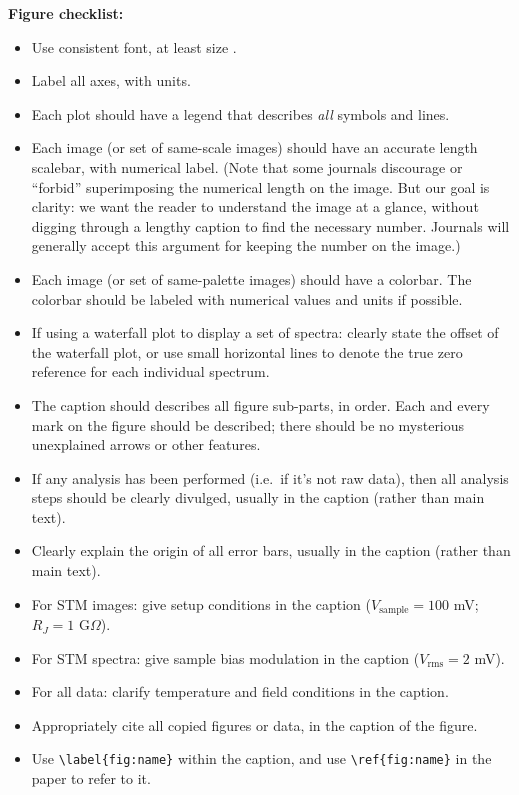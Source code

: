 \vspace{2mm}
\noindent \textbf{Figure checklist:}
\begin{itemize}[label=$\Box$]
\item Use consistent font, at least size \minfont.
\item Label all axes, with units.
\item Each plot should have a legend that describes {\em all} symbols and lines.
\item Each image (or set of same-scale images) should have an accurate length scalebar, with numerical label. (Note that some journals discourage or ``forbid'' superimposing the numerical length on the image. But our goal is clarity: we want the reader to understand the image at a glance, without digging through a lengthy caption to find the necessary number. Journals will generally accept this argument for keeping the number on the image.)
\item Each image (or set of same-palette images) should have a colorbar. The colorbar should be labeled with numerical values and units if possible.
\item If using a waterfall plot to display a set of spectra: clearly state the offset of the waterfall plot, or use small horizontal lines to denote the true zero reference for each individual spectrum.
\item The caption should describes all figure sub-parts, in order. Each and every mark on the figure should be described; there should be no mysterious unexplained arrows or other features.
\item If any analysis has been performed (i.e.\ if it's not raw data), then all analysis steps should be clearly divulged, usually in the caption (rather than main text).
\item Clearly explain the origin of all error bars, usually in the caption (rather than main text).
\item For STM images: give setup conditions in the caption ($V_\mathrm{sample}=100$ mV; $R_J=1$ G$\Omega$).
\item For STM spectra: give sample bias modulation in the caption ($V_\mathrm{rms}=2$ mV).
\item For all data: clarify temperature and field conditions in the caption.
\item Appropriately cite all copied figures or data, in the caption of the figure.
\item Use {\tt \textbackslash label\{fig:name\}} within the caption, and use {\tt \textbackslash ref\{fig:name\}} in the paper to refer to it.

\end{itemize}
